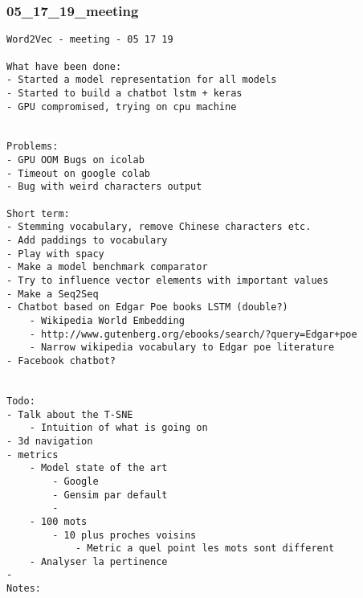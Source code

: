 \newpage
\subsubsection{05\_17\_19\_meeting}
\begin{lstlisting}
Word2Vec - meeting - 05 17 19

What have been done:
- Started a model representation for all models
- Started to build a chatbot lstm + keras
- GPU compromised, trying on cpu machine


Problems:
- GPU OOM Bugs on icolab
- Timeout on google colab
- Bug with weird characters output

Short term:
- Stemming vocabulary, remove Chinese characters etc.
- Add paddings to vocabulary
- Play with spacy
- Make a model benchmark comparator
- Try to influence vector elements with important values
- Make a Seq2Seq
- Chatbot based on Edgar Poe books LSTM (double?)
    - Wikipedia World Embedding
    - http://www.gutenberg.org/ebooks/search/?query=Edgar+poe
    - Narrow wikipedia vocabulary to Edgar poe literature
- Facebook chatbot?


Todo:
- Talk about the T-SNE
    - Intuition of what is going on
- 3d navigation
- metrics
    - Model state of the art
        - Google
        - Gensim par default
        - 
    - 100 mots
        - 10 plus proches voisins
            - Metric a quel point les mots sont different
    - Analyser la pertinence
- 
Notes:
\end{lstlisting}

